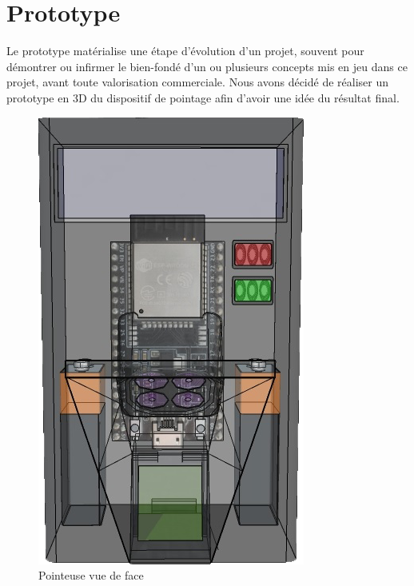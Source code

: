    
\section{Prototype}
Le prototype matérialise une étape d’évolution d’un projet, souvent pour démontrer ou infirmer le bien-fondé d’un ou plusieurs concepts mis en jeu dans ce projet, avant toute valorisation commerciale.
Nous avons décidé de réaliser un prototype en 3D du dispositif de pointage afin d’avoir une idée du résultat final.
\clearpage
    \begin{figure}[!htb]
       \begin{minipage}{0.5\textwidth}
         \centering
         \includegraphics[scale=0.6]{images/prototype/1.png}
         \caption{Pointeuse vue de face}\label{ }
       \end{minipage}\hfill
       \begin{minipage}{0.5\textwidth}
         \centering

\end{minipage}
\end{figure}
